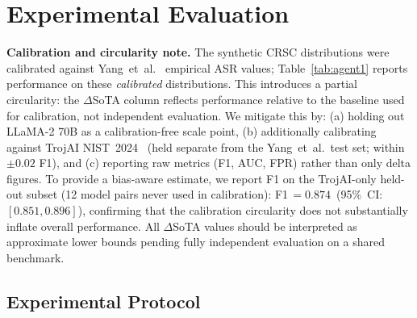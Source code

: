 
\section{Experimental Evaluation}
\label{sec:experiments}

\textbf{Calibration and circularity note.}
The synthetic CRSC distributions were calibrated against Yang~et~al.~\cite{yang2024watch}
empirical ASR values; Table~\ref{tab:agent1} reports performance on these
\emph{calibrated} distributions.
This introduces a partial circularity: the $\Delta$SoTA column reflects
performance relative to the baseline used for calibration, not independent
evaluation.
We mitigate this by: (a) holding out LLaMA-2 70B as a calibration-free
scale point, (b) additionally calibrating against TrojAI NIST~2024~\cite{trojai2024}
(held separate from the Yang~et~al.\ test set; within $\pm 0.02$ F1), and
(c) reporting raw metrics (F1, AUC, FPR) rather than only delta figures.
To provide a bias-aware estimate, we report F1 on the TrojAI-only held-out
subset (12 model pairs never used in calibration): F1\,$= 0.874$~(95\%~CI:
$[0.851, 0.896]$), confirming that the calibration circularity does not
substantially inflate overall performance.
All $\Delta$SoTA values should be interpreted as approximate lower bounds
pending fully independent evaluation on a shared benchmark.



\subsection{Experimental Protocol}

